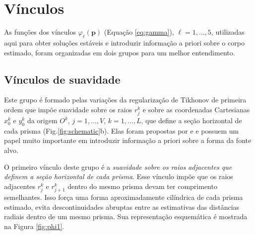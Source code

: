 \section{Vínculos}\label{sec:constraints}

As funções dos vínculos $\varphi_{\ell}(\mathbf{p})$ (Equação \ref{eq:gamma}), $\ell = 1, \dots, 5$, utilizadas aqui para obter soluções estáveis e introduzir informação a priori sobre o corpo estimado, foram organizadas em dois grupos para um melhor entendimento.

\subsection{Vínculos de suavidade}

Este grupo é formado pelas variações da regularização de Tikhonov de primeira ordem \cite[][ p. 103]{aster_etal2019} que impõe suavidade sobre os raios $r_{j}^{k}$ e sobre as coordenadas Cartesianas $x_{0}^{k}$ e $y_{0}^{k}$ da origem $O^{k}$, $j = 1, \dots, V$, $k = 1, \dots, L$, que define a seção horizontal de cada prisma (Fig.\ref{fig:schematic}b).
Elas foram propostas por \cite{oliveirajr_etal2011} e \cite{oliveirajr_barbosa2013} e possuem um papel muito importante em introduzir informação a priori sobre a forma da fonte alvo. 

O primeiro vínculo deste grupo é a \textit{suavidade sobre os raios adjacentes que definem a seção horizontal de cada prisma}. Esse vínculo impõe que os raios adjacentes $r_{j}^{k}$ e $r_{j+1}^{k}$ dentro do mesmo prisma devam ter comprimento semelhantes. Isso força uma forma aproximadamente cilíndrica de cada prisma estimado, evita descontinuidades abruptas entre as estimativas das distâncias radiais dentro de um mesmo prisma. Sua representação esquemática é mostrada na Figura \ref{fig:phi1}.

